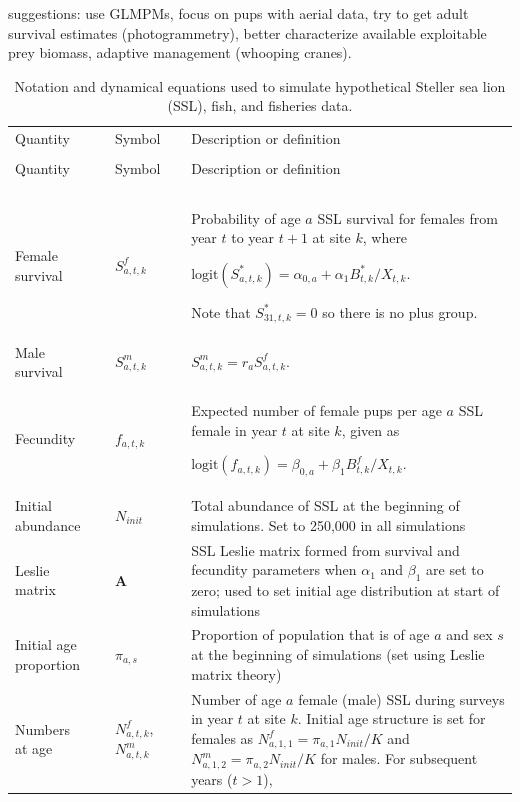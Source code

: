 \documentclass[nonumbib,leqno]{nrc1}
\begin{document}
suggestions: use GLMPMs, focus on pups with aerial data, try to get adult survival estimates (photogrammetry), better characterize available exploitable prey biomass, adaptive management (whooping cranes).




\begin{longtable}{p{4cm}lll p{8cm}}
\caption[Population \& Fisheries dynamics]{\large Notation and dynamical equations used to simulate
 hypothetical Steller sea lion (SSL), fish, and fisheries data.} \label{tab:model} \\
\hline \hline
Quantity & & Symbol & & Description or definition \\
\cline{1-1} \cline{3-3} \cline{5-5} \\
\endfirsthead
\hline \hline
Quantity & & Symbol & & Description or definition \\
\cline{1-1} \cline{3-3} \cline{5-5} \\
\endhead
\hline
\endfoot
\hline
\endlastfoot
\multicolumn{1}{l}{\textbf{Steller sea lion dynamics}}\\
Female survival & & $S_{a,t,k}^f$ & & Probability of age $a$ SSL survival for females from year $t$ to year $t+1$ at site $k$, where

$\textrm{logit}(S_{a,t,k}^*)=\alpha_{0,a}+\alpha_1 B_{t,k}^*/X_{t,k}$.

Note that $S_{31,t,k}^*=0$ so there is no plus group.\\
Male survival & & $S_{a,t,k}^{m}$ & & $S_{a,t,k}^{m}=r_a S_{a,t,k}^f$.  \\
Fecundity & & $f_{a,t,k}$ & & Expected number of female pups per age $a$ SSL female in year $t$ at site $k$,
given as

$\textrm{logit}(f_{a,t,k})=\beta_{0,a}+\beta_1 B_{t,k}^f/X_{t,k}$. \\
Initial abundance & & $N_{init}$ & & Total abundance of SSL at the beginning of simulations.  Set to 250,000 in all simulations \\
Leslie matrix & & $\textbf{A}$ & & SSL Leslie matrix formed from survival and fecundity parameters when $\alpha_1$ and $\beta_1$ are set to zero; used to set initial age distribution at start of simulations \\
Initial age proportion & & $\pi_{a,s}$ & & Proportion of population that is of age $a$ and sex $s$ at the beginning of simulations (set using Leslie matrix theory) \\
Numbers at age & & $N_{a,t,k}^f$,$N_{a,t,k}^{m}$ & & Number of age $a$ female (male) SSL during surveys in year $t$ at site $k$.  Initial age structure is set for females as $N_{a,1,1}^f=\pi_{a,1}N_{init}/K $ and $N_{a,1,2}^m=\pi_{a,2}N_{init}/K $ for males.  For subsequent years ($t>1$),


\end{longtable}
\end{document}
